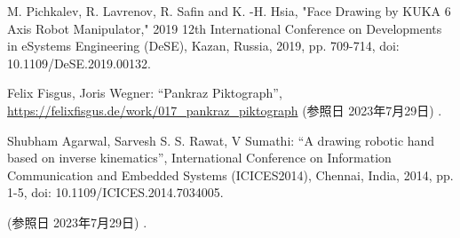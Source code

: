 \documentclass[10pt]{jarticle}
\begin{document}
    \vspace{5truemm}
    {\footnotesize
        \begin{thebibliography}{99}
            
            M. Pichkalev, R. Lavrenov, R. Safin and K. -H. Hsia, "Face Drawing by KUKA 6 Axis Robot Manipulator," 2019 12th International Conference on Developments in eSystems Engineering (DeSE), Kazan, Russia, 2019, pp. 709-714, doi: 10.1109/DeSE.2019.00132.

            Felix Fisgus, Joris Wegner: ``Pankraz Piktograph'', 
            \url{https://felixfisgus.de/work/017\_pankraz\_piktograph}
            (参照日 2023年7月29日) .
            
            Shubham Agarwal, Sarvesh S. S. Rawat, V Sumathi: ``A drawing robotic hand based on inverse kinematics'', 
            International Conference on Information Communication and Embedded Systems (ICICES2014), Chennai, India, 2014, pp. 1-5, doi: 10.1109/ICICES.2014.7034005.

			\url{}
            (参照日 2023年7月29日) .
            
            
        \end{thebibliography}
    }
    \normalsize
    
\end{document}
